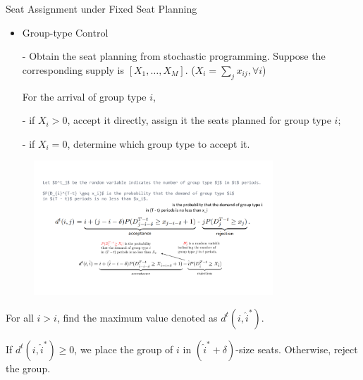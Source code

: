   \begin{frame}{Seat Assignment under Fixed Seat Planning}
    \small
    \begin{itemize}
      \item Group-type Control
      \item[-] Obtain the seat planning from stochastic programming. Suppose the corresponding supply is $[X_1, \ldots, X_M]$. ($X_{i} = \sum_{j} x_{ij}, \forall i$)
      
      For the arrival of group type $i$,

      \item[-] if $X_i > 0$, accept it directly, assign it the seats planned for group type $i$;
      \item[-] if $X_i = 0$, determine which group type to accept it.
    \end{itemize}



    \vspace{-0.5cm}

    \begin{figure}[h]
      \centering
      \includegraphics[width = 0.8\textwidth]{./images/group_type.pdf}
    \end{figure}

    \vspace{-0.1cm}

    For all $\hat{i} > i$, find the maximum value denoted as $d^{t}(i, \hat{i}^{*})$.
    
    If $d^{t}(i, \hat{i}^{*}) \geq 0$, we place the group of $i$ in $(\hat{i}^{*} + \delta)$-size seats. Otherwise, reject the group.

  \end{frame}
  
